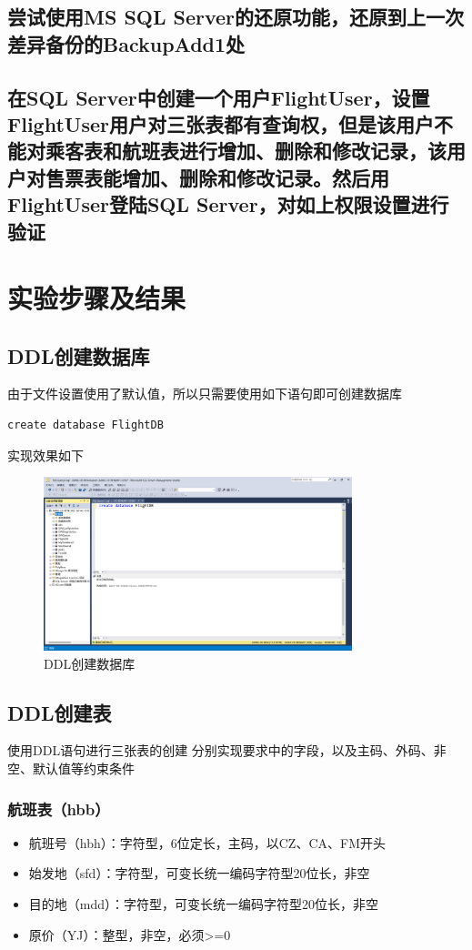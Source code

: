 \documentclass[UTF8,12pt]{article}
\begin{document}
\subsection{尝试使用MS SQL Server的还原功能，还原到上一次差异备份的BackupAdd1处}

\subsection{在SQL Server中创建一个用户FlightUser，设置FlightUser用户对三张表都有查询权，但是该用户不能对乘客表和航班表进行增加、删除和修改记录，该用户对售票表能增加、删除和修改记录。然后用FlightUser登陆SQL Server，对如上权限设置进行验证}

\section{实验步骤及结果}
\subsection{DDL创建数据库}
由于文件设置使用了默认值，所以只需要使用如下语句即可创建数据库

\begin{lstlisting}[title=DDL创建数据库,frame=shadowbox]
    create database FlightDB
\end{lstlisting}

实现效果如下
\begin{figure}[htbp]
    \centering
    \includegraphics[width=0.8\textwidth]{img/1.png}
    \caption{DDL创建数据库}
\end{figure}

\subsection{DDL创建表}
使用DDL语句进行三张表的创建
分别实现要求中的字段，以及主码、外码、非空、默认值等约束条件

\subsubsection{航班表（hbb）}
\begin{itemize}
    \item 航班号（hbh）：字符型，6位定长，主码，以CZ、CA、FM开头
    \item 始发地（sfd）：字符型，可变长统一编码字符型20位长，非空
    \item 目的地（mdd）：字符型，可变长统一编码字符型20位长，非空
    \item 原价（YJ）：整型，非空，必须>=0
\end{itemize}
\end{document}
